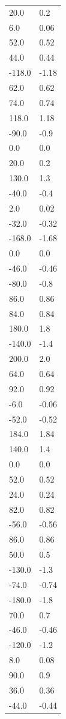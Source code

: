 \begin{longtable}{ll}
20.0 & 0.2 \\
6.0 & 0.06 \\
52.0 & 0.52 \\
44.0 & 0.44 \\
-118.0 & -1.18 \\
62.0 & 0.62 \\
74.0 & 0.74 \\
118.0 & 1.18 \\
-90.0 & -0.9 \\
0.0 & 0.0 \\
20.0 & 0.2 \\
130.0 & 1.3 \\
-40.0 & -0.4 \\
2.0 & 0.02 \\
-32.0 & -0.32 \\
-168.0 & -1.68 \\
0.0 & 0.0 \\
-46.0 & -0.46 \\
-80.0 & -0.8 \\
86.0 & 0.86 \\
84.0 & 0.84 \\
180.0 & 1.8 \\
-140.0 & -1.4 \\
200.0 & 2.0 \\
64.0 & 0.64 \\
92.0 & 0.92 \\
-6.0 & -0.06 \\
-52.0 & -0.52 \\
184.0 & 1.84 \\
140.0 & 1.4 \\
0.0 & 0.0 \\
52.0 & 0.52 \\
24.0 & 0.24 \\
82.0 & 0.82 \\
-56.0 & -0.56 \\
86.0 & 0.86 \\
50.0 & 0.5 \\
-130.0 & -1.3 \\
-74.0 & -0.74 \\
-180.0 & -1.8 \\
70.0 & 0.7 \\
-46.0 & -0.46 \\
-120.0 & -1.2 \\
8.0 & 0.08 \\
90.0 & 0.9 \\
36.0 & 0.36 \\
-44.0 & -0.44 \\

\end{longtable}
